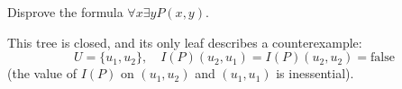 \begin{exl}
\label{exl:CounterexampleFinite}
Disprove the formula $\forall x \exists y P(x,y)$.
\begin{prooftree}
\end{prooftree}

This tree is closed, and its only leaf describes a counterexample:
\[
U = \{u_1, u_2\}, \quad I(P)(u_2,u_1) = I(P)(u_2,u_2) = \text{false}
\]
(the value of $I(P)$ on $(u_1, u_2)$ and $(u_1, u_1)$ is inessential).
\end{exl}
